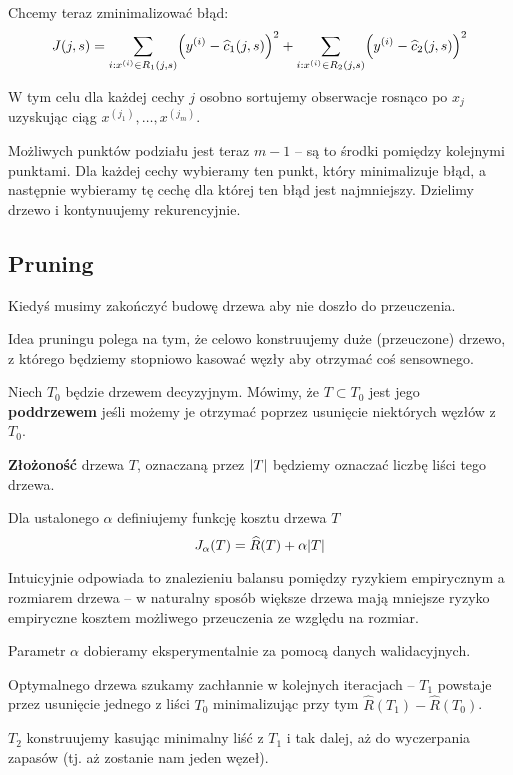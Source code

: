 Chcemy teraz zminimalizować błąd:
\[
	J(j, s) =
	\sum_{i : x^{(i)} \in R_1(j, s)}\pars{y^{(i)} - \widehat c_1(j, s)}^2
	+
	\sum_{i : x^{(i)} \in R_2(j, s)}\pars{y^{(i)} - \widehat c_2(j, s)}^2
\]

W tym celu dla każdej cechy \( j \) osobno sortujemy obserwacje rosnąco po \( x_j \) uzyskując ciąg \( x^{(j_1)}, \dots, x^{(j_m)} \).

Możliwych punktów podziału jest teraz \( m - 1 \) -- są to środki pomiędzy kolejnymi punktami.
Dla każdej cechy wybieramy ten punkt, który minimalizuje błąd, a następnie wybieramy tę cechę dla której ten błąd jest najmniejszy.
Dzielimy drzewo i kontynuujemy rekurencyjnie.

\subsection{Pruning}
Kiedyś musimy zakończyć budowę drzewa aby nie doszło do przeuczenia.

Idea pruningu polega na tym, że celowo konstruujemy duże (przeuczone) drzewo, z którego będziemy stopniowo kasować węzły aby otrzymać coś sensownego.

\begin{definition}
	Niech \( T_0 \) będzie drzewem decyzyjnym.
	Mówimy, że \( T \subset T_0 \) jest jego \textbf{poddrzewem} jeśli możemy je otrzymać poprzez usunięcie niektórych węzłów z \( T_0 \).
\end{definition}
\begin{definition}
	\textbf{Złożoność} drzewa \( T \), oznaczaną przez \( \card{T} \) będziemy oznaczać liczbę liści tego drzewa.
\end{definition}

Dla ustalonego \( \alpha \) definiujemy funkcję kosztu drzewa \( T \)
\[
	J_\alpha(T) = \widehat R(T) + \alpha \card{T}
\]

Intuicyjnie odpowiada to znalezieniu balansu pomiędzy ryzykiem empirycznym a rozmiarem drzewa -- w naturalny sposób większe drzewa mają mniejsze ryzyko empiryczne kosztem możliwego przeuczenia ze względu na rozmiar.

Parametr \( \alpha \) dobieramy eksperymentalnie za pomocą danych walidacyjnych.

Optymalnego drzewa szukamy zachłannie w kolejnych iteracjach -- \( T_1 \) powstaje przez usunięcie jednego z liści \( T_0 \) minimalizując przy tym \( \widehat R(T_1) - \widehat R(T_0) \).

\( T_2 \) konstruujemy kasując minimalny liść z \( T_1 \) i tak dalej, aż do wyczerpania zapasów (tj. aż zostanie nam jeden węzeł).


